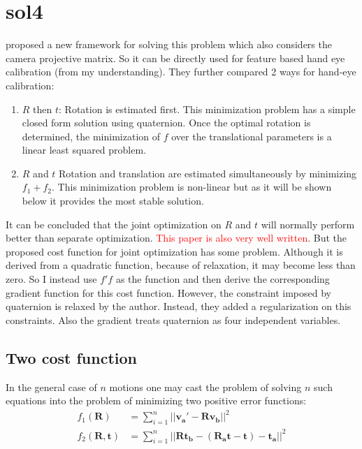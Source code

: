 \documentclass[a4paper]{report}
\begin{document}
\section{sol4}
\cite{horaud1995hand} proposed a new framework for solving this problem which also considers the camera projective matrix. So it can be directly used for feature based hand eye calibration (from my understanding). They further compared 2 ways for hand-eye calibration:
\begin{enumerate}
	\item $R$ then $t$: Rotation is estimated first. This minimization problem has a simple closed 
form solution using quaternion. Once the optimal rotation is determined,  
the minimization of $f$ over the translational parameters is a linear least squared problem.
	\item $R$ and $t$ Rotation and translation are estimated simultaneously by minimizing $f_1+f_2$. This
minimization problem is non-linear but as it will be shown below it provides the most stable
solution.
\end{enumerate}
It can be concluded that the joint optimization on $R$ and $t$ will normally perform better than separate optimization. \textcolor{red}{This paper is also very well written}. But the proposed cost function for joint optimization has some problem. Although it is derived from a quadratic function, because of relaxation, it may become less than zero. So I instead use $f'f$ as the function and then derive the corresponding gradient function for this cost function. However, the constraint imposed by quaternion is relaxed by the author. Instead, they added a  regularization on this constraints. Also the gradient treats quaternion as four independent variables.\\
\subsection{Two cost function}
In the general case of $n$ motions one may cast the problem of solving 
$n$ such equations into the problem of minimizing two positive error functions:
\begin{align}
f_1(\mathbf{R})&=\sum_{i=1}^{n} ||\mathbf{v_a'-Rv_b}||^2 \\
f_2(\mathbf{R,t})&=\sum_{i=1}^{n} ||\mathbf{Rt_b-(R_at-t)-t_a}||^2 
\end{align}
\end{document}
